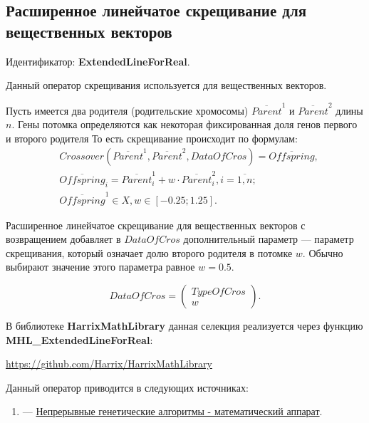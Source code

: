 \subsection{Расширенное линейчатое скрещивание для вещественных векторов}\label{SetOfOperatorsAlgorithms:ExtendedLineForReal}

Идентификатор: \textbf{ExtendedLineForReal}.

Данный оператор скрещивания используется для вещественных векторов.

Пусть имеется два родителя (родительские хромосомы) $ \overline{Parent}^1 $ и $ \overline{Parent}^2$ длины $n$. Гены потомка определяются как некоторая фиксированная доля генов первого и второго родителя То есть скрещивание происходит по формулам:
\begin{align}
\label{SetOfOperatorsAlgorithms:eq:ExtendedLineForReal}
&Crossover \left( \overline{Parent}^1, \overline{Parent}^2, DataOfCros\right)=\overline{Offspring}, \\
& \overline{Offspring}_i=\overline{Parent}^1_i+w\cdot\overline{Parent}^2_i , i=\overline{1,n};\nonumber\\
&\overline{Offspring}^1\in X, w\in \left[ -0.25; 1.25\right] .\nonumber
\end{align}

Расширенное линейчатое скрещивание для вещественных векторов с возвращением добавляет в $ DataOfCros $ дополнительный параметр --- параметр скрещивания, который означает долю второго родителя в потомке $ w $. Обычно выбирают значение этого параметра равное $ w=0.5 $.

\begin{equation}
DataOfCros=\left( \begin{array}{c} TypeOfCros \\ w \end{array} \right).
\end{equation}

В библиотеке \textbf{HarrixMathLibrary} данная селекция реализуется через функцию \textbf{MHL\_ExtendedLineForReal}:

\href{https://github.com/Harrix/HarrixMathLibrary}{https://github.com/Harrix/HarrixMathLibrary}

Данный оператор приводится в следующих источниках:

\begin{enumerate}
\item \cite{web:basegroup.ru:real_coded_ga} ---  \href{http://www.basegroup.ru/library/optimization/real_coded_ga/}{Непрерывные генетические алгоритмы - математический аппарат}.
\end{enumerate}